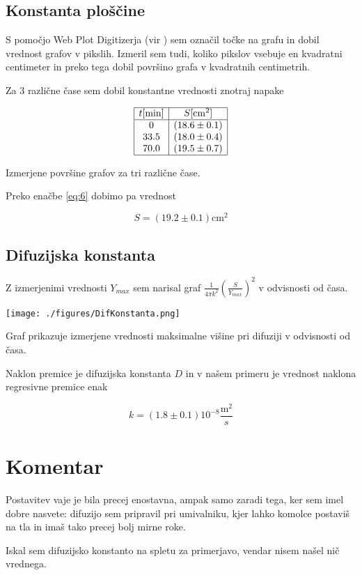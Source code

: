 \documentclass[11pt]{article}
\begin{document}
\subsection{Konstanta ploščine}\label{sec:org31b401e}

S pomočjo Web Plot Digitizerja (vir \cite{noauthor_webplotdigitizer_nodate}) sem označil točke na grafu in dobil vrednost grafov v pikslih. Izmeril sem tudi, koliko pikslov vsebuje en kvadratni centimeter in preko tega dobil površino grafa v kvadratnih centimetrih.

Za 3 različne čase sem dobil konstantne vrednosti znotraj napake

\begin{tabela}
  \centering
\[
  \begin{array}{|c|c|} \hline
    t [\mathrm{min}] & S [\mathrm{cm} ^2] \\ \hline
   0 & (18.6 \pm 0.1) \\
    33.5 & (18.0 \pm 0.4) \\
    70.0 & (19.5 \pm 0.7) \\ \hline
  \end{array}
\]
\caption{\small Izmerjene površine grafov za tri različne čase.}
\end{tabela}

Preko enačbe \ref{eq:6} dobimo pa vrednost

\[ S = (19.2 \pm 0.1) \mathrm{cm} ^2
\]
\subsection{Difuzijska konstanta}\label{sec:orga79e3ef}

Z izmerjenimi vrednosti \(Y_{max}\) sem narisal graf \(\frac{1}{4 \pi k ^2} \left( \frac{S}{Y_{max}} \right)^2\) v odvisnosti od časa.

\begin{slika}[H]
  \centering
  \texttt{[image: ./figures/DifKonstanta.png]}
  \caption{\small Graf prikazuje izmerjene vrednosti maksimalne višine pri difuziji v odvisnosti od časa.}
\end{slika}

Naklon premice je difuzijska konstanta \(D\) in v našem primeru je vrednost naklona regresivne premice enak

\[ k = (1.8 \pm 0.1) 10^{-8} \frac{\mathrm{m} ^2}{s}
\]
\section{Komentar}\label{sec:org58c18e0}

Postavitev vaje je bila precej enostavna, ampak samo zaradi tega, ker sem imel dobre nasvete: difuzijo sem pripravil pri umivalniku, kjer lahko komolce postaviš na tla in imaš tako precej bolj mirne roke.

Iskal sem difuzijsko konstanto na spletu za primerjavo, vendar nisem našel nič vrednega.

\printbibliography[heading=bibintoc]
\end{document}
